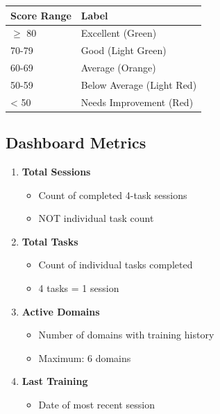 \documentclass[12pt,a4paper]{article}
\begin{document}
\begin{table}[h]
\centering
\begin{tabular}{ll}
\toprule
\textbf{Score Range} & \textbf{Label} \\
\midrule
$\geq$ 80 & Excellent (Green) \\
70-79 & Good (Light Green) \\
60-69 & Average (Orange) \\
50-59 & Below Average (Light Red) \\
< 50 & Needs Improvement (Red) \\
\bottomrule
\end{tabular}
\end{table}

\subsection{Dashboard Metrics}

\begin{enumerate}
    \item \textbf{Total Sessions}
    \begin{itemize}
        \item Count of completed 4-task sessions
        \item NOT individual task count
    \end{itemize}
    
    \item \textbf{Total Tasks}
    \begin{itemize}
        \item Count of individual tasks completed
        \item 4 tasks = 1 session
    \end{itemize}
    
    \item \textbf{Active Domains}
    \begin{itemize}
        \item Number of domains with training history
        \item Maximum: 6 domains
    \end{itemize}
    
    \item \textbf{Last Training}
    \begin{itemize}
        \item Date of most recent session
    \end{itemize}
\end{enumerate}
\end{document}
